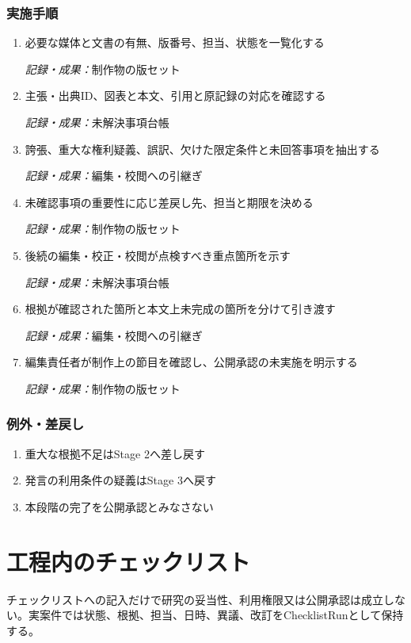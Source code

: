 \documentclass[a4paper,11pt]{article}
\begin{document}
\subsubsection*{実施手順}
\begin{enumerate}[leftmargin=2em,itemsep=0.65em]
\item 必要な媒体と文書の有無、版番号、担当、状態を一覧化する\par\noindent\textit{記録・成果：}制作物の版セット\nobreak\smallskip
\item 主張・出典ID、図表と本文、引用と原記録の対応を確認する\par\noindent\textit{記録・成果：}未解決事項台帳\nobreak\smallskip
\item 誇張、重大な権利疑義、誤訳、欠けた限定条件と未回答事項を抽出する\par\noindent\textit{記録・成果：}編集・校閲への引継ぎ\nobreak\smallskip
\item 未確認事項の重要性に応じ差戻し先、担当と期限を決める\par\noindent\textit{記録・成果：}制作物の版セット\nobreak\smallskip
\item 後続の編集・校正・校閲が点検すべき重点箇所を示す\par\noindent\textit{記録・成果：}未解決事項台帳\nobreak\smallskip
\item 根拠が確認された箇所と本文上未完成の箇所を分けて引き渡す\par\noindent\textit{記録・成果：}編集・校閲への引継ぎ\nobreak\smallskip
\item 編集責任者が制作上の節目を確認し、公開承認の未実施を明示する\par\noindent\textit{記録・成果：}制作物の版セット\nobreak\smallskip
\end{enumerate}
\subsubsection*{例外・差戻し}
\begin{enumerate}[leftmargin=2em,itemsep=0.35em]
\item 重大な根拠不足はStage 2へ差し戻す
\item 発言の利用条件の疑義はStage 3へ戻す
\item 本段階の完了を公開承認とみなさない
\end{enumerate}
\section{工程内のチェックリスト}
\par チェックリストへの記入だけで研究の妥当性、利用権限又は公開承認は成立しない。実案件では状態、根拠、担当、日時、異議、改訂をChecklistRunとして保持する。\par\medskip
\end{document}
